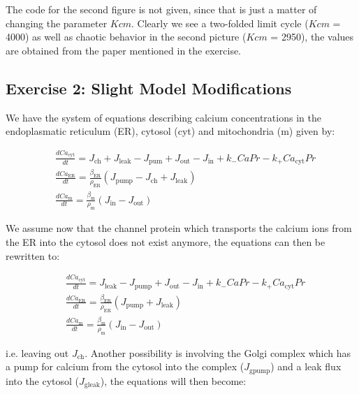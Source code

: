 \documentclass[11pt,a4paper,onecolumn]{article}
\begin{document}
\begin{figure}[H]
  \centering
\end{figure}

The code for the second figure is not given, since that is just a matter of changing the parameter $Kcm$. Clearly we see a two-folded limit cycle ($Kcm$ = 4000) as well as chaotic behavior in the second picture ($Kcm$ = 2950), the values are obtained from the paper mentioned in the exercise.

\subsection{Exercise 2: Slight Model Modifications}

We have the system of equations describing calcium concentrations in the endoplasmatic reticulum (ER), cytosol (cyt) and mitochondria (m) given by:

\begin{align*}
  &\frac{dCa_{\text{cyt}}}{dt} = J_{\text{ch}} + J_{\text{leak}} - J_{\text{pum}} + J_{\text{out}} - J_{\text{in}} + k_-CaPr - k_+Ca_{\text{cyt}}Pr \nonumber \\
  &\frac{dCa_{\text{ER}}}{dt} = \frac{\beta_{\text{ER}}}{\rho_{\text{ER}}}(J_{\text{pump}} - J_{\text{ch}} + J_{\text{leak}}) \nonumber \\
  &\frac{dCa_{\text{m}}}{dt} = \frac{\beta_{\text{m}}}{\rho_{\text{m}}}(J_{\text{in}} - J_{\text{out}})
\end{align*}

We assume now that the channel protein which transports the calcium ions from the ER into the cytosol does not exist anymore, the equations can then be rewritten to:

\begin{align*}
  &\frac{dCa_{\text{cyt}}}{dt} = J_{\text{leak}} - J_{\text{pump}} + J_{\text{out}} - J_{\text{in}} + k_-CaPr - k_+Ca_{\text{cyt}}Pr \nonumber \\
  &\frac{dCa_{\text{ER}}}{dt} = \frac{\beta_{\text{ER}}}{\rho_{\text{ER}}}(J_{\text{pump}} + J_{\text{leak}}) \nonumber \\
  &\frac{dCa_{\text{m}}}{dt} = \frac{\beta_{\text{m}}}{\rho_{\text{m}}}(J_{\text{in}} - J_{\text{out}})
\end{align*}

i.e. leaving out $J_{\text{ch}}$. Another possibility is involving the Golgi complex which has a pump for calcium from the cytosol into the complex ($J_{\text{gpump}}$) and a leak flux into the cytosol ($J_{\text{gleak}}$), the equations will then become:
\end{document}
